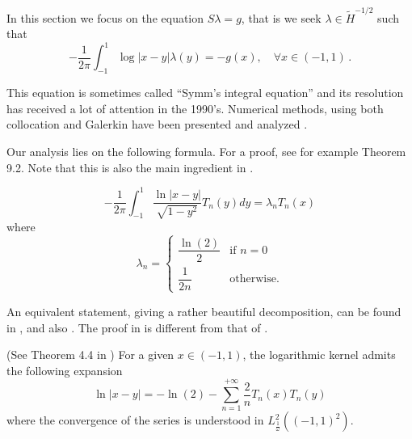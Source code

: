 \documentclass[a4paper]{article}
\begin{document}
	In this section we focus on the equation $S\lambda = g$, that is we seek $\lambda \in \tilde{H}^{-1/2}$ such that 
	\begin{equation}
	-\frac{1}{2\pi}\int_{-1}^{1} \log|x-y| \lambda(y) = -g(x), \quad \forall x\in (-1,1)\,.\label{Slambda}
	\end{equation} 
	
	This equation is sometimes called ``Symm's integral equation'' and its resolution has received a lot of attention in the 1990's. Numerical methods, using both collocation and Galerkin have been presented and analyzed \cite{atkinson1991numerical,yan1988integral,yan1990cosine,sloan1992collocation,yan1989mesh}. 
	
	
	Our analysis lies on the following formula. For a proof, see for example \cite{mason2002chebyshev} Theorem 9.2. Note that this is also the main ingredient in \cite{bruno2012second}.
	
	\begin{Prop}
		\[ -\frac{1}{2\pi}\int_{-1}^{1} \frac{\ln|x-y|}{\sqrt{1 - y^2}}T_n(y)dy = \lambda_n T_n(x)\]
		where
		\[\lambda_n = \begin{cases}
		\dfrac{\ln(2)}{2} & \text{if } n=0\\
		\dfrac{1}{2n} & \text{otherwise}.
		\end{cases}\]
		\label{STn}
	\end{Prop}
	An equivalent statement, giving a rather beautiful decomposition, can be found in \cite{jerez2012explicit}, and also \cite{urzua2014optimal}. The proof in \cite{jerez2012explicit} is different from that of \cite{mason2002chebyshev}.
	\begin{The}(See Theorem 4.4 in \cite{jerez2012explicit})	
		For a given $x \in (-1,1)$, the logarithmic kernel admits the following expansion 
		\[ \ln|x-y| = -\ln(2) - \sum_{n=1}^{+\infty} \frac{2}{n}T_n(x)T_n(y)\]
		where the convergence of the series is understood in $L^2_\frac{1}{\omega}((-1,1)^2)$.
	\end{The}
	
\end{document}
